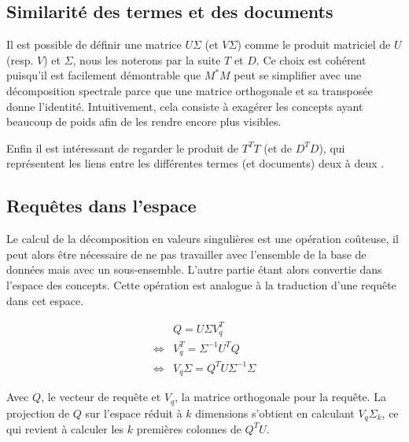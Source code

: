 \subsection{Similarité des termes et des documents}

Il est possible de définir une matrice $U\Sigma$ (et $V\Sigma$) comme le produit matriciel de $U$ (resp. $V$) et $\Sigma$, nous les noterons par la suite $T$ et $D$. Ce choix est cohérent puisqu'il est facilement démontrable que $M^{*}M$ peut se simplifier avec une décomposition spectrale parce que une matrice orthogonale et sa transposée donne l'identité. Intuitivement, cela consiste à exagérer les concepts ayant beaucoup de poids afin de les rendre encore plus visibles.

Enfin il est intéressant de regarder le produit de $T^{T}T$ (et de $D^{T}D$), qui représentent les liens entre les différentes termes (et documents) deux à deux \cite{landauer1998introduction}.

\subsection{Requêtes dans l'espace}

Le calcul de la décomposition en valeurs singulières est une opération coûteuse, il peut alors être nécessaire de ne pas travailler avec l'ensemble de la base de données mais avec un sous-ensemble. L'autre partie étant alors convertie dans l'espace des concepts. Cette opération est analogue à la traduction d'une requête dans cet espace.

$$ \begin{matrix}
&Q=U\Sigma V_q^T \\
\Leftrightarrow &V_q^T = \Sigma^{-1}U^TQ \\
\Leftrightarrow &V_q\Sigma = Q^TU\Sigma^{-1}\Sigma
\end{matrix} $$



Avec $Q$, le vecteur de requête et $V_{q}$, la matrice orthogonale pour la requête. La projection de $Q$ sur l'espace réduit à $k$ dimensions s'obtient en calculant $V_{q}\Sigma_{k}$, ce qui revient à calculer les $k$ premières colonnes de $Q^{T}U$.

\begin{footnotesize}


\end{footnotesize}